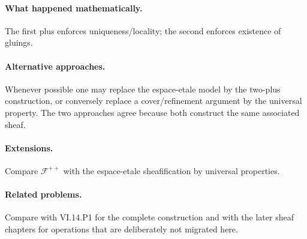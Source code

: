 \paragraph{What happened mathematically.}
The first plus enforces uniqueness/locality; the second enforces existence of gluings.

\paragraph{Alternative approaches.}
Whenever possible one may replace the espace-etale model by the two-plus construction, or conversely replace a cover/refinement argument by the universal property.  The two approaches agree because both construct the same associated sheaf.

\paragraph{Extensions.}
Compare $\mathcal F^{++}$ with the espace-etale sheafification by universal properties.

\paragraph{Related problems.}
Compare with VI.14.P1 for the complete construction and with the later sheaf chapters for operations that are deliberately not migrated here.
\fi

